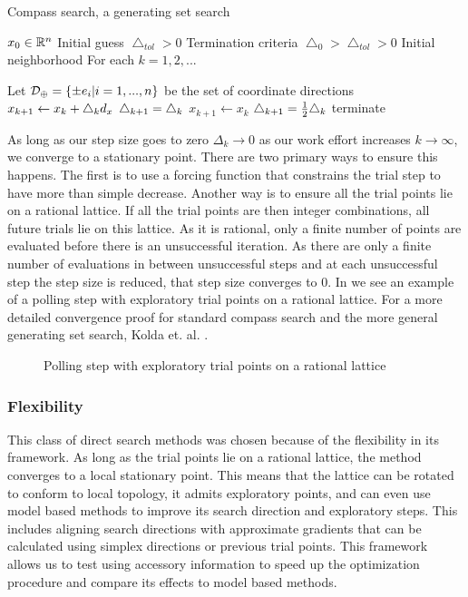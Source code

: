 \begin{algorithm}
\caption{Compass search, a generating set search}\label{dfo_genset}
\begin{algorithmic}
\State $x_0 \in \mathbb{R}^{n}$ Initial guess
\State $\bigtriangleup_{tol} >0$ Termination criteria
\State $\bigtriangleup_0 > \bigtriangleup_{tol} >0$ Initial neighborhood
\BState For each $k=1,2,...$

\State Let $\mathcal{D}_\oplus =\left\{ \pm e_i| i=1,...,n\right\}$ be the set of coordinate directions
\State $x_{k+1} \gets x_k + \bigtriangleup_k d_x$
\State $\bigtriangleup_{k+1} = \bigtriangleup_k$
\Else
\State $x_{k+1} \gets x_k$
\State $\bigtriangleup_{k+1} = \frac{1}{2} \bigtriangleup_k$
 terminate \EndIf
\EndIf
\EndProcedure
\end{algorithmic}
\end{algorithm}

As long as our step size goes to zero $\Delta_k \rightarrow 0$ as our work effort increases $k\rightarrow \infty$, we converge to a stationary point.  There are two primary ways to ensure this happens.  The first is to use a forcing function that constrains the trial step to have more than simple decrease.  Another way is to ensure all the trial points lie on a rational lattice.  If all the trial points are then integer combinations, all future trials lie on this lattice.  As it is rational, only a finite number of points are evaluated before there is an unsuccessful iteration.  As there are only a finite number of evaluations in between unsuccessful steps and at each unsuccessful step the step size is reduced, that step size converges to 0.  In  we see an example of a polling step with exploratory trial points on a rational lattice. For a more detailed convergence proof for standard compass search and the more general generating set search, Kolda et. al. \cite{kolda_2003}.



\begin{figure}
\centering

\caption{Polling step with exploratory trial points on a rational lattice}\label{fig:explore}
\end{figure}




\subsubsection{Flexibility}
This class of direct search methods was chosen because of the flexibility in its framework.   As long as the trial points lie on a rational lattice, the method converges to a local stationary point.  This means that the lattice can be rotated to conform to local topology, it admits exploratory points, and can even use model based methods to improve its search direction and exploratory steps.  This includes aligning search directions with approximate gradients that can be calculated using simplex directions or previous trial points. This framework allows us to test using accessory information to speed up the optimization procedure and compare its effects to model based methods.


